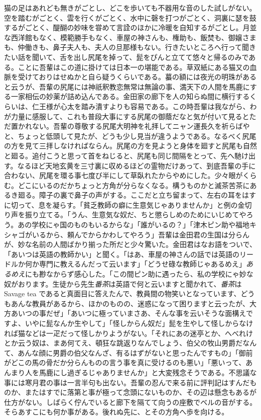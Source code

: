 \documentclass[12pt, openright]{book}
\begin{document}
猫の足はあれども無きがごとし、どこを歩いても不器用な音のした試しがない。空を踏むがごとく、雲を行くがごとく、水中に磬を打つがごとく、洞裏に瑟を鼓するがごとく、醍醐の妙味を甞めて言詮のほかに冷暖を自知するがごとし。月並な西洋館もなく、模範勝手もなく、車屋の神さんも、権助も、飯焚も、御嬢さまも、仲働きも、鼻子夫人も、夫人の旦那様もない。行きたいところへ行って聞きたい話を聞いて、舌を出し尻尾を掉って、髭をぴんと立てて悠々と帰るのみである。ことに吾輩はこの道に掛けては日本一の堪能である。草双紙にある猫又の血脈を受けておりはせぬかと自ら疑うくらいである。蟇の額には夜光の明珠があると云うが、吾輩の尻尾には神祇釈教恋無常は無論の事、満天下の人間を馬鹿にする一家相伝の妙薬が詰め込んである。金田家の廊下を人の知らぬ間に横行するくらいは、仁王様が心太を踏み潰すよりも容易である。この時吾輩は我ながら、わが力量に感服して、これも普段大事にする尻尾の御蔭だなと気が付いて見るとただ置かれない。吾輩の尊敬する尻尾大明神を礼拝してニャン運長久を祈らばやと、ちょっと低頭して見たが、どうも少し見当が違うようである。なるべく尻尾の方を見て三拝しなければならん。尻尾の方を見ようと身体を廻すと尻尾も自然と廻る。追付こうと思って首をねじると、尻尾も同じ間隔をとって、先へ馳け出す。なるほど天地玄黄を三寸裏に収めるほどの霊物だけあって、到底吾輩の手に合わない、尻尾を環る事七度び半にして草臥れたからやめにした。少々眼がくらむ。どこにいるのだかちょっと方角が分らなくなる。構うものかと滅茶苦茶にあるき廻る。障子の裏で鼻子の声がする。ここだと立ち留まって、左右の耳をはすに切って、息を凝らす。「貧乏教師の癖に生意気じゃありませんか」と例の金切り声を振り立てる。「うん、生意気な奴だ、ちと懲らしめのためにいじめてやろう。あの学校にゃ国のものもいるからな」「誰がいるの？」「津木ピン助や福地キシャゴがいるから、頼んでからかわしてやろう」吾輩は金田君の生国は分らんが、妙な名前の人間ばかり揃った所だと少々驚いた。金田君はなお語をついで、「あいつは英語の教師かい」と聞く。「はあ、車屋の神さんの話では英語のリードルか何か専門に教えるんだって云います」「どうせ碌な教師じゃあるめえ」\emph{あるめえ}にも尠なからず感心した。「この間ピン助に遇ったら、私の学校にゃ妙な奴がおります。生徒から先生\emph{番茶}は英語で何と云いますと聞かれて、\emph{番茶}は Savage tea であると真面目に答えたんで、教員間の物笑いとなっています、どうもあんな教員があるから、ほかのものの、迷惑になって困りますと云ったが、大方あいつの事だぜ」「あいつに極っていまさあ、そんな事を云いそうな面構えですよ、いやに髭なんか生やして」「怪しからん奴だ」髭を生やして怪しからなければ猫などは一疋だって怪しかりようがない。「それにあの迷亭とか、へべれけとか云う奴は、まあ何てえ、頓狂な跳返りなんでしょう、伯父の牧山男爵だなんて、あんな顔に男爵の伯父なんざ、有るはずがないと思ったんですもの」「御前がどこの馬の骨だか分らんものの言う事を真に受けるのも悪い」「悪いって、あんまり人を馬鹿にし過ぎるじゃありませんか」と大変残念そうである。不思議な事には寒月君の事は一言半句も出ない。吾輩の忍んで来る前に評判記はすんだものか、またはすでに落第と事が極って念頭にないものか、その辺は懸念もあるが仕方がない。しばらく佇んでいると廊下を隔てて向うの座敷でベルの音がする。そらあすこにも何か事がある。後れぬ先に、とその方角へ歩を向ける。
\end{document}
